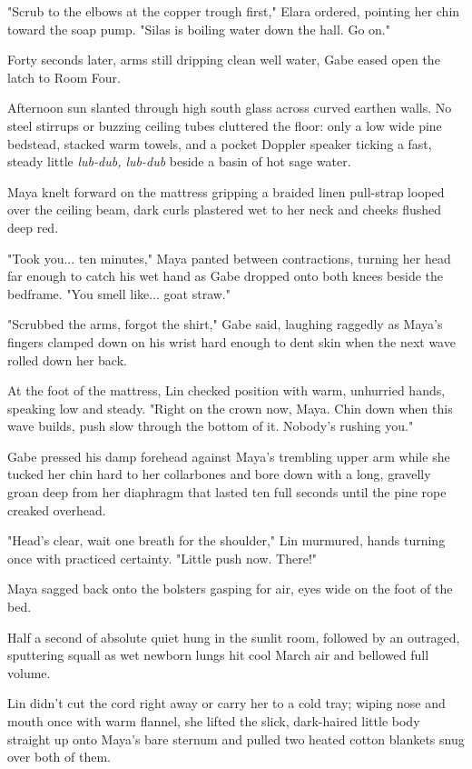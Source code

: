 "Scrub to the elbows at the copper trough first," Elara ordered, pointing her chin toward the soap pump. "Silas is boiling water down the hall. Go on."

Forty seconds later, arms still dripping clean well water, Gabe eased open the latch to Room Four.

Afternoon sun slanted through high south glass across curved earthen walls. No steel stirrups or buzzing ceiling tubes cluttered the floor: only a low wide pine bedstead, stacked warm towels, and a pocket Doppler speaker ticking a fast, steady little \textit{lub-dub, lub-dub} beside a basin of hot sage water.

Maya knelt forward on the mattress gripping a braided linen pull-strap looped over the ceiling beam, dark curls plastered wet to her neck and cheeks flushed deep red.

"Took you... ten minutes," Maya panted between contractions, turning her head far enough to catch his wet hand as Gabe dropped onto both knees beside the bedframe. "You smell like... goat straw."

"Scrubbed the arms, forgot the shirt," Gabe said, laughing raggedly as Maya's fingers clamped down on his wrist hard enough to dent skin when the next wave rolled down her back.

At the foot of the mattress, Lin checked position with warm, unhurried hands, speaking low and steady. "Right on the crown now, Maya. Chin down when this wave builds, push slow through the bottom of it. Nobody's rushing you."

Gabe pressed his damp forehead against Maya's trembling upper arm while she tucked her chin hard to her collarbones and bore down with a long, gravelly groan deep from her diaphragm that lasted ten full seconds until the pine rope creaked overhead.

"Head's clear, wait one breath for the shoulder," Lin murmured, hands turning once with practiced certainty. "Little push now. There!"

Maya sagged back onto the bolsters gasping for air, eyes wide on the foot of the bed.

Half a second of absolute quiet hung in the sunlit room, followed by an outraged, sputtering squall as wet newborn lungs hit cool March air and bellowed full volume.

Lin didn't cut the cord right away or carry her to a cold tray; wiping nose and mouth once with warm flannel, she lifted the slick, dark-haired little body straight up onto Maya's bare sternum and pulled two heated cotton blankets snug over both of them.

